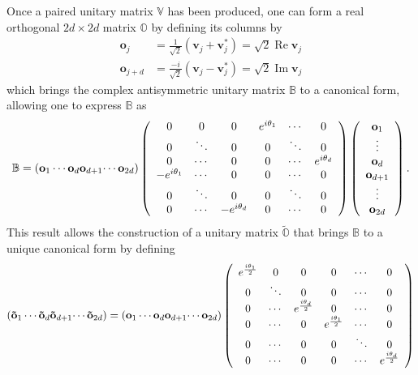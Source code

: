 \documentclass[preprint,aps,showkeys]{revtex4}%
\begin{document}
Once a paired unitary matrix $\mathbb{V}$ has been produced, one can form a
real orthogonal $2d\times2d$ matrix $\mathbb{O}$ by defining its columns by
\begin{align}
\mathbf{o}_{j}  &  =\frac{1}{\sqrt{2}}\left(  \mathbf{v}_{j}+\mathbf{v}%
_{j}^{\ast}\right)  =\sqrt{2}\operatorname{Re}\mathbf{v}_{j}\nonumber\\
\mathbf{o}_{j+d}  &  =\frac{-i}{\sqrt{2}}\left(  \mathbf{v}_{j}-\mathbf{v}%
_{j}^{\ast}\right)  =\sqrt{2}\operatorname{Im}\mathbf{v}_{j}%
\end{align}
which brings the complex antisymmetric unitary matrix $\mathbb{B}$ to a
canonical form, allowing one to express $\mathbb{B}$ as
\begin{equation}
\mathbb{B}=\left(  \mathbf{o}_{1}\cdots\mathbf{o}_{d}\mathbf{o}_{d+1}%
\mathbf{\cdots o}_{2d}\right)  \left(
\begin{array}
[c]{cccccc}%
0 & 0 & 0 & e^{i\theta_{1}} & \cdots & 0\\
0 & \ddots & 0 & 0 & \ddots & 0\\
0 & \cdots & 0 & 0 & \cdots & e^{i\theta_{d}}\\
-e^{i\theta_{1}} & \cdots & 0 & 0 & \cdots & 0\\
0 & \ddots & 0 & 0 & \ddots & 0\\
0 & \cdots & -e^{i\theta_{d}} & 0 & \cdots & 0
\end{array}
\right)  \left(
\begin{array}
[c]{c}%
\mathbf{o}_{1}\\
\vdots\\
\mathbf{o}_{d}\\
\mathbf{o}_{d+1}\\
\vdots\\
\mathbf{o}_{2d}%
\end{array}
\right)  . \label{reex1}%
\end{equation}
This result allows the construction of a unitary matrix $\widetilde
{\mathbb{O}}$ that brings $\mathbb{B}$ to a unique canonical form by defining
\begin{equation}
\left(  \mathbf{\tilde{o}}_{1}\cdots\mathbf{\tilde{o}}_{d}\mathbf{\tilde{o}%
}_{d+1}\mathbf{\cdots\tilde{o}}_{2d}\right)  =\left(  \mathbf{o}_{1}%
\cdots\mathbf{o}_{d}\mathbf{o}_{d+1}\mathbf{\cdots o}_{2d}\right)  \left(
\begin{array}
[c]{cccccc}%
e^{\frac{i\theta_{1}}{2}} & 0 & 0 & 0 & \cdots & 0\\
0 & \ddots & 0 & 0 & \cdots & 0\\
0 & \cdots & e^{\frac{i\theta_{d}}{2}} & 0 & \cdots & 0\\
0 & \cdots & 0 & e^{\frac{i\theta_{1}}{2}} & \cdots & 0\\
0 & \cdots & 0 & 0 & \ddots & 0\\
0 & \cdots & 0 & 0 & \cdots & e^{\frac{i\theta_{d}}{2}}%
\end{array}
\right)
\end{equation}
\end{document}
